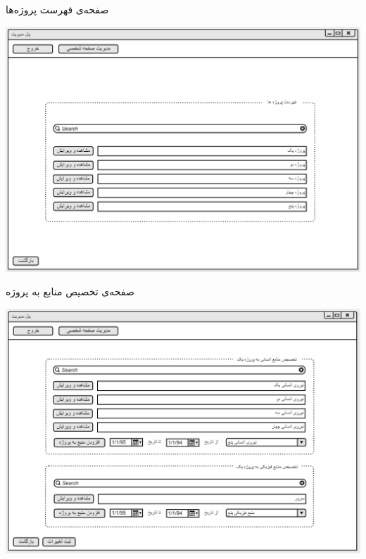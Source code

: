 \vspace{1cm}
صفحه‌ی فهرست پروژه‌ها
\begin{center}
\includegraphics[width=\textwidth]{Prototype/HeadManager/HeadManagerProjectsList.png}
\end{center}

\newpage
\vspace{1cm}
صفحه‌ی تخصیص منابع به پروژه
\begin{center}
\includegraphics[width=\textwidth]{Prototype/HeadManager/ResourceAssigment.png}
\end{center}

